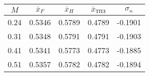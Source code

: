 \begin{tabular}{|c|c|c|c|c|}
\hline
$M$ & $\bar{x}_{F}$ & $\bar{x}_{H}$ & $\bar{x}_{ТПЗ}$ & $\sigma_{n}$ \\ 
\hline
0.24 & 0.5346 & 0.5789 & 0.4789 & -0.1901 \\ 
\hline
0.31 & 0.5348 & 0.5791 & 0.4791 & -0.1903 \\ 
\hline
0.41 & 0.5341 & 0.5773 & 0.4773 & -0.1885 \\ 
\hline
0.51 & 0.5357 & 0.5782 & 0.4782 & -0.1894 \\ 
\hline
\end{tabular}